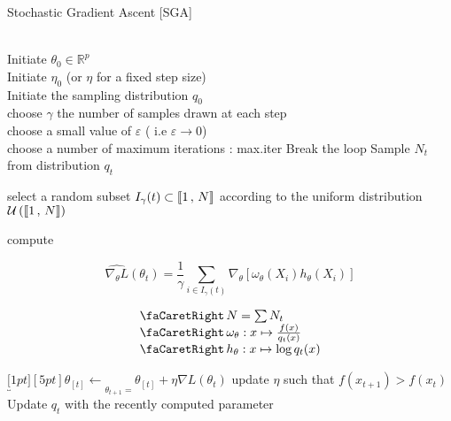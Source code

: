 \begin{algorithm}[H]
    \caption{Stochastic Gradient Ascent [SGA]}\label{alg:gaAdaptive}
    \begin{algorithmic}
        \Require 
        \\ \ra Initiate $\theta_0 \in \mathbb R^p$ 
        \\ \ra Initiate $\eta_0$ (or $\eta$ for a fixed step size) 
        \\ \ra Initiate the sampling distribution $q_0$
        \bigskip
        \\  choose $\gamma$ the number of samples drawn at each step
        \bigskip
        \\ \ra choose a small value of $\varepsilon$ ( i.e $\varepsilon \rightarrow 0 $)
        \\ \ra choose a number of maximum iterations : max.iter
        \State Break the loop
        \EndIf
            \State Sample $N_t$ from distribution $q_t$ 

            \bigskip

            \State {} select a random subset $I_\gamma(t) \subset \llbracket 1 \, , \, N \rrbracket$ according to the uniform distribution $\mathcal U \left( \llbracket 1 \, , \, N \rrbracket \right)$

            \bigskip

            \State {} compute 
            
            $$\widehat{\nabla_\theta L}(\theta_t) = \frac 1 \gamma \displaystyle\sum\limits_{i \in I_\gamma(t)} \nabla_\theta \left[\omega_\theta(X_i) h_\theta(X_i)\right]$$ 
            

            $$\begin{array}{l}
            \faCaretRight \, {N = \sum N_t}
             \\
            \faCaretRight \, {\omega_\theta : x \mapsto \frac{f(x)}{q_t(x)}}
             \\
            \faCaretRight \, {h_\theta : x \mapsto \log q_t(x)}
            \end{array}
            $$

            \smallskip

            \State \ra $\underbracket[1pt][5pt]{\theta_{[t]} \gets}_{\theta_{t+1} = } \theta_{[t]} + \eta \nabla L(\theta_t)$
            \State \ra update $\eta$ such that $f(x_{t+1}) > f(x_t)$ 
            \State \ra Update $q_t$ with the recently computed parameter
        \EndFor  
    \end{algorithmic}
    \end{algorithm}